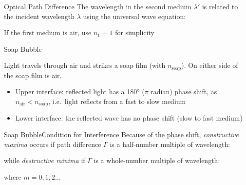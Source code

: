 \documentclass[12pt,compress,aspectratio=169]{beamer}
\begin{document}
\begin{frame}{Optical Path Difference}
  The wavelength in the second medium $\lambda'$ is related to the incident
  wavelength $\lambda$ using the universal wave equation:

  
  If the first medium is air,  use $n_1=1$ for simplicity
\end{frame}



\begin{frame}{Soap Bubble}
  \begin{center}
  \end{center}
  \vspace{-.1in}Light travels through air and strikes a soap film (with
  $n_\text{soap}$). On either side of the soap film is air.
  \begin{itemize}
  \item Upper interface: reflected light has a \ang{180} ($\pi$ radian)
    phase shift, as $n_\text{air}<n_\text{soap}$, i.e.\ light reflects from a
    fast to slow medium
  \item Lower interface: the reflected wave has no phase shift (slow to
    fast medium)
  \end{itemize}
\end{frame}



\begin{frame}{Soap Bubble}{Condition for Interference}
  Because of the phase shift, \emph{constructive maxima} occurs if path
  difference $\Gamma$ is a half-number multiple of wavelength:
   

  while \emph{destructive minima} if $\Gamma$ is a whole-number multiple of
  wavelength:


  where $m=0,1,2\ldots$
\end{frame}
\end{document}
